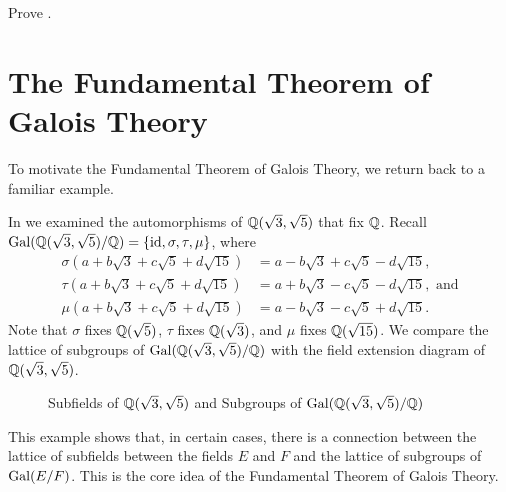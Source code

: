 \begin{exercise}\label{exercise-intermediate-field-of-galois-extension-is-galois-extension}
    Prove .
\end{exercise}

\section{The Fundamental Theorem of Galois Theory}
To motivate the Fundamental Theorem of Galois Theory, we return back to a familiar example.

\begin{example}
    In  we examined the automorphisms of $\mathbb{Q}(\sqrt3, \sqrt5)$ that fix $\mathbb{Q}$. Recall $\mathrm{Gal}(\mathbb{Q}(\sqrt3,\sqrt5)/\mathbb{Q}) = \{\mathrm{id}, \sigma, \tau, \mu\}$, where
    \begin{align*}
        \sigma(a + b\sqrt3 + c\sqrt5 + d\sqrt{15}) &= a - b\sqrt3 + c\sqrt5 - d\sqrt{15},\\
        \tau(a + b\sqrt3 + c\sqrt5 + d\sqrt{15}) &= a + b\sqrt3 - c\sqrt5 - d\sqrt{15}, \text{ and}\\
        \mu(a + b\sqrt3 + c\sqrt5 + d\sqrt{15}) &= a - b\sqrt3 - c\sqrt5 + d\sqrt{15}.
    \end{align*}
    Note that $\sigma$ fixes $\mathbb{Q}(\sqrt5)$, $\tau$ fixes $\mathbb{Q}(\sqrt3)$, and $\mu$ fixes $\mathbb{Q}(\sqrt{15})$. We compare the lattice of subgroups of $\mathrm{Gal}(\mathbb{Q}(\sqrt3,\sqrt5)/\mathbb{Q})$ with the field extension diagram of $\mathbb{Q}(\sqrt3, \sqrt5)$.

    \begin{figure}[H]
        \centering
        \caption{Subfields of $\mathbb{Q}(\sqrt3,\sqrt5)$ and Subgroups of $\mathrm{Gal}(\mathbb{Q}(\sqrt3,\sqrt5)/\mathbb{Q})$}
    \end{figure}
\end{example}

This example shows that, in certain cases, there is a connection between the lattice of subfields between the fields $E$ and $F$ and the lattice of subgroups of $\mathrm{Gal}(E/F)$. This is the core idea of the Fundamental Theorem of Galois Theory.

